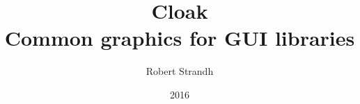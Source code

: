\documentclass[11pt]{book}
\title{{Cloak}\\{Common graphics for GUI libraries}}
\author{Robert Strandh}
\date{2016}
\def\inputtex#1{}
\begin{document}

\maketitle

\newpage

{\setlength{\parskip}{0cm}
\tableofcontents}

\inputtex{chap-intro.tex}
\inputtex{chap-coordinates.tex}
\inputtex{chap-clipping.tex}
\inputtex{chap-canvas.tex}
\inputtex{chap-mask.tex}
\inputtex{chap-image.tex}
\inputtex{chap-drawing.tex}

{}


\printindex
\end{document}
